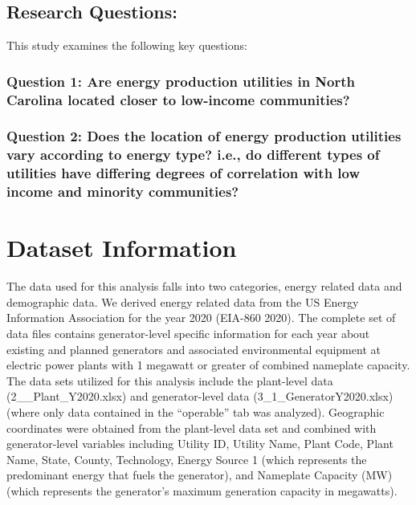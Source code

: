 \documentclass[
  12pt,
]{article}
\begin{document}
\hypertarget{research-questions}{%
\subsection{Research Questions:}\label{research-questions}}

This study examines the following key questions:

\hypertarget{question-1-are-energy-production-utilities-in-north-carolina-located-closer-to-low-income-communities}{%
\subsubsection{Question 1: Are energy production utilities in North
Carolina located closer to low-income
communities?}\label{question-1-are-energy-production-utilities-in-north-carolina-located-closer-to-low-income-communities}}

\hypertarget{question-2-does-the-location-of-energy-production-utilities-vary-according-to-energy-type-i.e.-do-different-types-of-utilities-have-differing-degrees-of-correlation-with-low-income-and-minority-communities}{%
\subsubsection{Question 2: Does the location of energy production
utilities vary according to energy type? i.e., do different types of
utilities have differing degrees of correlation with low income and
minority
communities?}\label{question-2-does-the-location-of-energy-production-utilities-vary-according-to-energy-type-i.e.-do-different-types-of-utilities-have-differing-degrees-of-correlation-with-low-income-and-minority-communities}}

\newpage

\hypertarget{dataset-information}{%
\section{Dataset Information}\label{dataset-information}}

The data used for this analysis falls into two categories, energy
related data and demographic data. We derived energy related data from
the US Energy Information Association for the year 2020 (EIA-860 2020).
The complete set of data files contains generator-level specific
information for each year about existing and planned generators and
associated environmental equipment at electric power plants with 1
megawatt or greater of combined nameplate capacity. The data sets
utilized for this analysis include the plant-level data
(2\_\_Plant\_Y2020.xlsx) and generator-level data
(3\_1\_GeneratorY2020.xlsx) (where only data contained in the
``operable'' tab was analyzed). Geographic coordinates were obtained
from the plant-level data set and combined with generator-level
variables including Utility ID, Utility Name, Plant Code, Plant Name,
State, County, Technology, Energy Source 1 (which represents the
predominant energy that fuels the generator), and Nameplate Capacity
(MW) (which represents the generator's maximum generation capacity in
megawatts).
\end{document}
